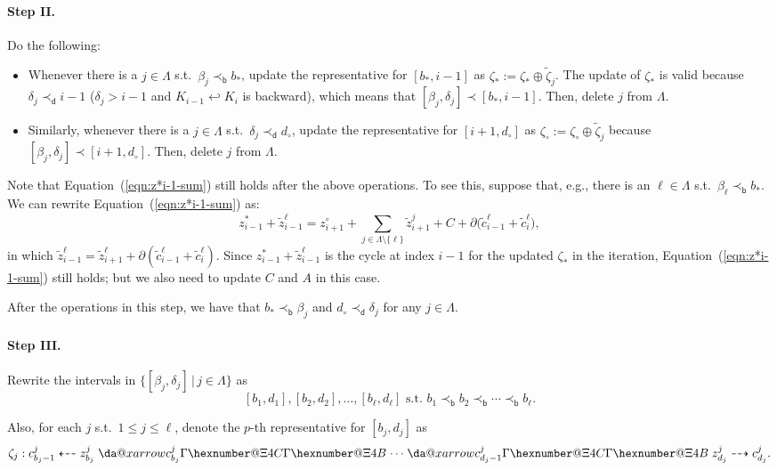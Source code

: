 \documentclass[letterpaper,11pt]{article}
\makeatletter
\theoremstyle{mythmstyle}
\theoremstyle{mydefstyle}
\theoremstyle{plain}
\theoremstyle{definition}
\newcommand{\<}[1]{\langle #1\rangle}
\newcommand{\bakincto}{\hookleftarrow}
\newcommand{\given}{\,|\,}
\newcommand{\Set}[1]{\{#1\}}
\newcommand{\bG}{\beta}
\newcommand{\dG}{\delta}
\newcommand{\LG}{\Lambda}
\newcommand{\Dim}{p}
\newcommand{\bles}{\prec_{\mathsf{b}}}
\newcommand{\dles}{\prec_{\mathsf{d}}}
\newcommand{\iles}{\prec}
\newcommand{\repsum}{\oplus}
\newcommand{\cyc}{z}
\newcommand{\chn}{c}
\newcommand{\rseq}{\zeta}
\newcommand*{\da@rightarrow}{\mathchar"0\hexnumber@\symAMSa 4B }
\newcommand*{\da@leftarrow}{\mathchar"0\hexnumber@\symAMSa 4C }
\newcommand{\xdashleftrightarrow}[2][]{%
  \mathrel{%
    \mathpalette{\da@xarrow{#1}{#2}\da@leftarrow\da@rightarrow{}{}}{}%
  }%
}
\newcommand*{\da@xarrow}[7]{%
  \sbox0{$\ifx#7\scriptstyle\scriptscriptstyle\else\scriptstyle\fi#5#1#6\m@th$}%
  \sbox2{$\ifx#7\scriptstyle\scriptscriptstyle\else\scriptstyle\fi#5#2#6\m@th$}%
  \sbox4{$#7\dabar@\m@th$}%
  \dimen@=\wd0 %
  \ifdim\wd2 >\dimen@
    \dimen@=\wd2 %
  \fi
  \count@=2 %
  \def\da@bars{\dabar@\dabar@}%
  \@whiledim\count@\wd4<\dimen@\do{%
    \advance\count@\@ne
    \expandafter\def\expandafter\da@bars\expandafter{%
      \da@bars
      \dabar@ 
    }%
  }%
  \mathrel{#3}%
  \mathrel{%
    \mathop{\da@bars}\limits
    \ifx\\#1\\%
    \else
      _{\copy0}%
    \fi
    \ifx\\#2\\%
    \else
      ^{\copy2}%
    \fi
  }%
  \mathrel{#4}%
  \!\!
}
\let\rseqlrarr\xdashleftrightarrow
\makeatother
\begin{document}
\paragraph{Step II.}
Do the following: 
\begin{itemize}
    \item Whenever there is a $j\in\LG$
s.t.\ $\bG_j\bles b_*$, 
update the representative for $[b_*,i-1]$ 
as $\rseq_*:=\rseq_*\repsum\tilde{\rseq}_j$.
The update of $\rseq_*$ is valid because
$\dG_j\dles i-1$ ($\dG_j>i-1$
and $K_{i-1}\bakincto K_i$ is backward),
which means that $[\bG_j,\dG_j]\iles[b_*,i-1]$.
Then, delete $j$ from $\LG$.
    \item Similarly,
whenever there is a $j\in\LG$
s.t.\ $\dG_j\dles d_\circ$,
update the representative for $[i+1,d_\circ]$ 
as $\rseq_\circ:=\rseq_\circ\repsum\tilde{\rseq}_j$
because $[\bG_j,\dG_j]\iles[i+1,d_\circ]$.
Then, delete $j$ from $\LG$.
\end{itemize}

Note that Equation~(\ref{eqn:z*i-1-sum}) still holds 
after the above operations.
To see this, suppose that, e.g., there is an $\ell\in\LG$
s.t.\ $\bG_\ell\bles b_*$. We can rewrite
Equation~(\ref{eqn:z*i-1-sum}) as:
\begin{equation*}
\cyc^*_{i-1}+\tilde{\cyc}^\ell_{i-1}=\cyc^\circ_{i+1}+\sum_{j\in\LG\setminus\Set{\ell}}\tilde{\cyc}^j_{i+1}+C+\partial\big(\tilde{\chn}^\ell_{i-1}+\tilde{\chn}^\ell_{i}\big),
\end{equation*}
in which 
$\tilde{\cyc}^\ell_{i-1}=\tilde{\cyc}^\ell_{i+1}+\partial(\tilde{\chn}^\ell_{i-1}+\tilde{\chn}^\ell_{i})$.
Since $\cyc^*_{i-1}+\tilde{\cyc}^\ell_{i-1}$
is the cycle at index $i-1$ for the updated $\rseq_*$ in the iteration,
Equation~(\ref{eqn:z*i-1-sum}) still holds;
but we also need to update $C$ and $A$ in this case.

After the operations in this step, we have that $b_*\bles\bG_j$
and $d_\circ\dles\dG_j$ for any $j\in\LG$.

\paragraph{Step III.}
Rewrite the intervals in $\Set{[\bG_j,\dG_j]\given j\in\LG}$
as 
\[[b_1,d_1],[b_2,d_2],\ldots,[b_\ell,d_\ell]\text{ s.t.\ }b_1\bles b_2\bles\cdots\bles b_\ell.\]

Also, for each $j$ s.t.\ $1\leq j\leq\ell$, 
denote the $\Dim$-th representative for $[b_j,d_j]$ as
\[{\rseq}_j:{\chn}^j_{b_j-1}\dashleftarrow{\cyc}^j_{b_j}
\rseqlrarr{{\chn}^j_{b_j}}\cdots
\rseqlrarr{{\chn}^j_{d_j-1}}{\cyc}^j_{d_j}\dashrightarrow{\chn}^j_{d_j}.\]
\end{document}
